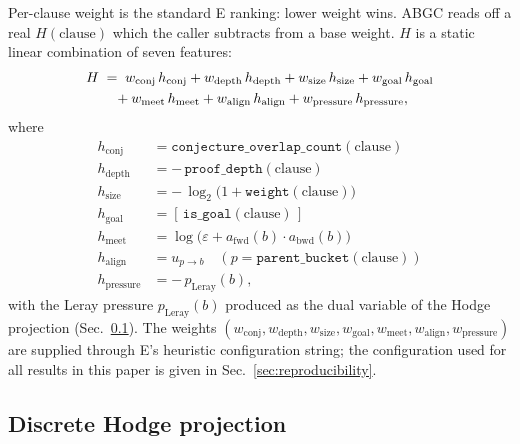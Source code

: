 \documentclass[11pt]{article}
\begin{document}
Per-clause weight is the standard E ranking: lower weight wins. ABGC reads
off a real $H(\textrm{clause})$ which the caller subtracts from a base weight.
$H$ is a static linear combination of seven features:
\begin{align}
   H &\;=\; w_\mathrm{conj}\,h_\mathrm{conj}
            + w_\mathrm{depth}\,h_\mathrm{depth}
            + w_\mathrm{size}\,h_\mathrm{size}
            + w_\mathrm{goal}\,h_\mathrm{goal} \notag \\
     &\;\;\;\;{}+ w_\mathrm{meet}\,h_\mathrm{meet}
            + w_\mathrm{align}\,h_\mathrm{align}
            + w_\mathrm{pressure}\,h_\mathrm{pressure},
\end{align}
where
\begin{align}
   h_\mathrm{conj}     &= \texttt{conjecture\_overlap\_count}(\textrm{clause}) \\
   h_\mathrm{depth}    &= -\,\texttt{proof\_depth}(\textrm{clause}) \\
   h_\mathrm{size}     &= -\,\log_2\bigl(1 + \texttt{weight}(\textrm{clause})\bigr) \\
   h_\mathrm{goal}     &= [\,\texttt{is\_goal}(\textrm{clause})\,] \\
   h_\mathrm{meet}     &= \log\!\bigl(\varepsilon + a_\mathrm{fwd}(b) \cdot a_\mathrm{bwd}(b)\bigr) \\
   h_\mathrm{align}    &= u_{p \to b}\quad (p = \texttt{parent\_bucket}(\textrm{clause})) \\
   h_\mathrm{pressure} &= -\,p_\mathrm{Leray}(b),
\end{align}
with the Leray pressure $p_\mathrm{Leray}(b)$ produced as the dual variable
of the Hodge projection (Sec.~\ref{sec:hodge}). The weights
$(w_\mathrm{conj}, w_\mathrm{depth}, w_\mathrm{size}, w_\mathrm{goal},
 w_\mathrm{meet}, w_\mathrm{align}, w_\mathrm{pressure})$ are supplied
through E's heuristic configuration string; the configuration used for
all results in this paper is given in Sec.~\ref{sec:reproducibility}.

\subsection{Discrete Hodge projection}\label{sec:hodge}
\end{document}
